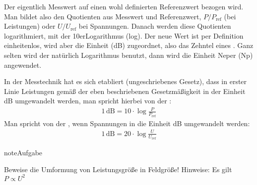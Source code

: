 \documentclass[letterpaper,10pt,english]{jupyterBook}
\begin{document}
\sphinxAtStartPar
Der eigentlich Messwert auf einen wohl definierten Referenzwert bezogen wird. Man bildet also den Quotienten aus Messwert und Referenzwert, \(P/P_\mathrm{ref}\) (bei Leistungen) oder \(U/U_\mathrm{ref}\) bei Spannungen. Danach werden diese Quotienten logarithmiert,  mit der 10er\sphinxhyphen{}Logarithmus (log). Der neue Wert ist per Definition einheitenlos, wird aber die Einheit  (dB) zugeordnet, also das Zehntel eines . Ganz selten wird der natürlich Logarithmus benutzt, dann wird die Einheit Neper (Np) angewendet.

\sphinxAtStartPar
In der Messtechnik hat es sich etabliert (ungeschriebenes Gesetz), dass in erster Linie Leistungen gemäß der eben beschriebenen Gesetzmäßigkeit in der Einheit dB umgewandelt werden, man spricht hierbei von der :
\begin{equation*}
\begin{split}1\,\mathrm{dB} = 10 \cdot \log\frac{P}{P_\mathrm{ref}}\end{split}
\end{equation*}
\sphinxAtStartPar
Man spricht von der , wenn Spannungen in die Einheit dB umgewandelt werden:
\begin{equation*}
\begin{split}1\,\mathrm{dB} = 20 \cdot \log\frac{U}{U_\mathrm{ref}}\end{split}
\end{equation*}
\begin{sphinxadmonition}{note}{Aufgabe}

\sphinxAtStartPar
Beweise die Umformung von Leistungsgröße in Feldgröße! Hinweise: Es gilt \(P \propto U^2\)
\end{sphinxadmonition}
\end{document}
